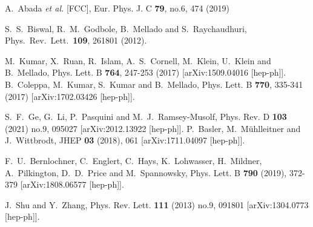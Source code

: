 \documentclass[pdftex,twocolumn,epjc3]{svjour3}          %
\begin{document}
\begin{thebibliography}{9}
A.~Abada \textit{et al.} [FCC],
Eur. Phys. J. C \textbf{79}, no.6, 474 (2019)

  S.~S.~Biswal, R.~M.~Godbole, B.~Mellado and S.~Raychaudhuri,
  Phys.\ Rev.\ Lett.\ {\bf 109}, 261801 (2012).

M.~Kumar, X.~Ruan, R.~Islam, A.~S.~Cornell, M.~Klein, U.~Klein and B.~Mellado,
Phys. Lett. B \textbf{764}, 247-253 (2017)
[arXiv:1509.04016 [hep-ph]].
B.~Coleppa, M.~Kumar, S.~Kumar and B.~Mellado,
Phys. Lett. B \textbf{770}, 335-341 (2017)
[arXiv:1702.03426 [hep-ph]].

S.~F.~Ge, G.~Li, P.~Pasquini and M.~J.~Ramsey-Musolf,
Phys. Rev. D \textbf{103} (2021) no.9, 095027
[arXiv:2012.13922 [hep-ph]].
P.~Basler, M.~M\"uhlleitner and J.~Wittbrodt,
JHEP \textbf{03} (2018), 061
[arXiv:1711.04097 [hep-ph]].

F.~U.~Bernlochner, C.~Englert, C.~Hays, K.~Lohwasser, H.~Mildner, A.~Pilkington, D.~D.~Price and M.~Spannowsky,
Phys. Lett. B \textbf{790} (2019), 372-379
[arXiv:1808.06577 [hep-ph]].

J.~Shu and Y.~Zhang,
Phys. Rev. Lett. \textbf{111} (2013) no.9, 091801
[arXiv:1304.0773 [hep-ph]].


\end{thebibliography}
\end{document}
